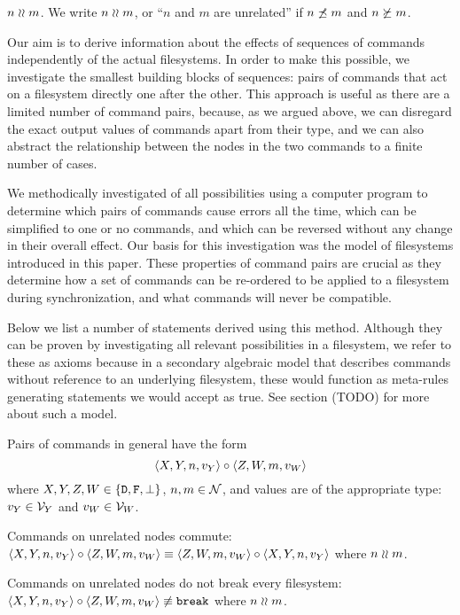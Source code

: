 \begin{mydef}{$n\mathrel{\wr\wr} m$.}
We write $n\mathrel{\wr\wr} m$, or ``$n$ and $m$ are unrelated'' if $n\not\preceq m$ and $n\not\succeq m$.
\end{mydef}


Our aim is to derive information about the effects of sequences
of commands independently of the actual filesystems.
In order to make this possible, we investigate the smallest building
blocks of sequences: pairs of commands that act on a filesystem directly one after the other.
This approach is useful as there are a limited number of command pairs,
because, as we argued above, we can disregard the exact output values of commands apart from their type,
and we can also abstract the relationship between the nodes in the two commands
to a finite number of cases.

We methodically investigated of all possibilities using a computer program
to determine
which pairs of commands cause errors all the time,
which can be simplified to one or no commands, and which can be reversed
without any change in their overall effect.
Our basis for this investigation was the model of filesystems introduced in this paper.
These properties of command pairs are crucial as they determine
how a set of commands can be re-ordered to be applied to a filesystem
during synchronization, and what commands will never be compatible.

Below we list a number of statements derived using this method.
Although they can be proven by investigating all relevant possibilities
in a filesystem, we refer to these as axioms because in a secondary algebraic model
that describes commands without reference to an underlying filesystem,
these would function as meta-rules generating statements we would accept as true.
See section (TODO) for more about such a model.

\medskip

Pairs of commands in general have the form
\[ \langle{X,Y,n,v_Y}\rangle\circ  \langle{Z,W,m,v_W}\rangle \]
where $X,Y,Z,W\in\{\mathtt{D},\mathtt{F},\bot\}$, $n,m\in\mathcal{N}$, 
and values are of the appropriate type: 
$v_Y\in\mathcal{V}_{Y}$ and $v_W\in\mathcal{V}_{W}$.

\begin{myax}\label{ax_separate_commute}
Commands on unrelated nodes commute:
$\langle{X,Y,n,v_Y}\rangle\circ\langle{Z,W,m,v_W}\rangle \equiv \langle{Z,W,m,v_W}\rangle\circ\langle{X,Y,n,v_Y}\rangle$ where $n\mathrel{\wr\wr} m$.
\end{myax}

\begin{myax}\label{ax_separate_nobreaks}
Commands on unrelated nodes do not break every filesystem:
$\langle{X,Y,n,v_Y}\rangle\circ\langle{Z,W,m,v_W}\rangle \not\equiv \mathtt{break}$ where $n\mathrel{\wr\wr} m$.
\end{myax}

